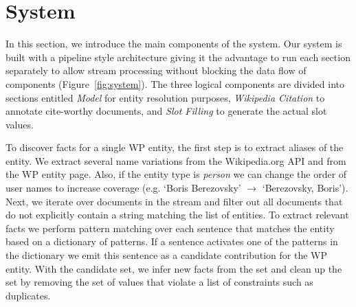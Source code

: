 \documentclass[letterpaper]{article}
\begin{document}
\section{System}

In this section, we introduce the main components of the system.
Our system is built with a pipeline style architecture giving it the advantage to run each section separately to allow stream processing without blocking the data flow of components (Figure~\ref{fig:system}).
The three logical components are divided into sections entitled \textit{Model} for entity resolution purposes,
\textit{Wikipedia Citation} to annotate cite-worthy documents,
and \textit{Slot Filling} to generate the actual slot values.


To discover facts for a single WP entity, the first step is to extract aliases of the entity.
We extract several name variations from the Wikipedia.org API and from the WP entity page.
Also, if the entity type is \textit{person} we can change the order of user names to increase coverage (e.g. `Boris Berezovsky' $\rightarrow$ `Berezovsky, Boris').
Next, we iterate over documents in the stream and filter out all documents that do not explicitly contain a string matching 
the list of entities.
To extract relevant facts we perform pattern matching over each sentence that matches the entity based on a dictionary
of patterns.
If a sentence activates one of the patterns in the dictionary we emit this sentence as a candidate contribution
for the WP entity.
With the candidate set, we infer new facts from the set and clean up the set
by removing the set of values that violate a list of constraints such as duplicates.


\end{document}
